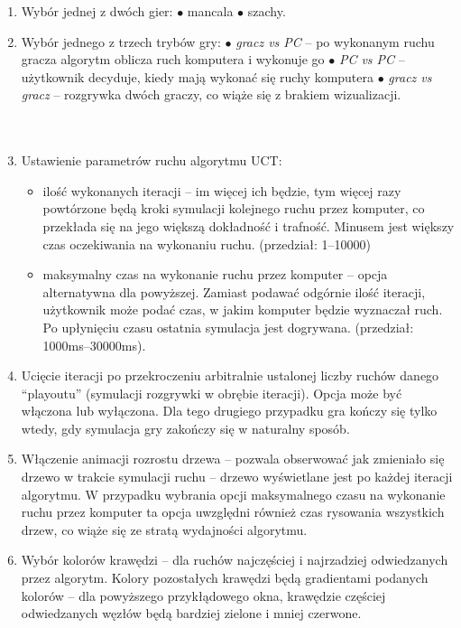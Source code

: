 \documentclass{article}
\begin{document}
\begin{enumerate}
	\item Wybór jednej z dwóch gier:
	\subitem $\bullet$ mancala
	\subitem $\bullet$ szachy.\\
	\item Wybór jednego z trzech trybów gry:
	\subitem $\bullet$ \textit{gracz vs PC} – po wykonanym ruchu gracza algorytm oblicza ruch komputera i wykonuje go
	\subitem $\bullet$ \textit{PC vs PC } – użytkownik decyduje, kiedy mają wykonać się ruchy komputera
	\subitem $\bullet$ \textit{gracz vs gracz} – rozgrywka dwóch graczy, co wiąże się z brakiem wizualizacji.\\\\\\
	\item Ustawienie parametrów ruchu algorytmu UCT:
	\begin{itemize}
 		\item ilość wykonanych iteracji – im więcej ich będzie, tym więcej razy powtórzone będą kroki symulacji kolejnego ruchu przez komputer, co przekłada się na jego większą dokładność i trafność. Minusem jest większy czas oczekiwania na wykonaniu ruchu. (przedział: 1–10000)
		\item maksymalny czas na wykonanie ruchu przez komputer – opcja alternatywna dla powyższej. Zamiast podawać odgórnie ilość iteracji, użytkownik może podać czas, w jakim komputer będzie wyznaczał ruch. Po upłynięciu czasu ostatnia symulacja jest dogrywana. (przedział: 1000ms–30000ms).\\
	\end{itemize}
	\item Ucięcie iteracji po przekroczeniu arbitralnie ustalonej liczby ruchów danego ``playoutu'' (symulacji rozgrywki w obrębie iteracji). Opcja może być włączona lub wyłączona. Dla tego drugiego przypadku gra kończy się tylko wtedy, gdy symulacja gry zakończy się w naturalny sposób.\\
	\item Włączenie animacji rozrostu drzewa – pozwala obserwować jak zmieniało się drzewo w trakcie symulacji ruchu – drzewo wyświetlane jest po każdej iteracji algorytmu. W przypadku wybrania opcji maksymalnego czasu na wykonanie ruchu przez komputer ta opcja uwzględni również czas rysowania wszystkich drzew, co wiąże się ze stratą wydajności algorytmu.\\
	\item Wybór kolorów krawędzi – dla ruchów najczęściej i najrzadziej odwiedzanych przez algorytm. Kolory pozostałych krawędzi będą gradientami podanych kolorów – dla powyższego przykłądowego okna, krawędzie częściej odwiedzanych węzłów będą bardziej zielone i mniej czerwone.\\

\end{enumerate}
\end{document}

